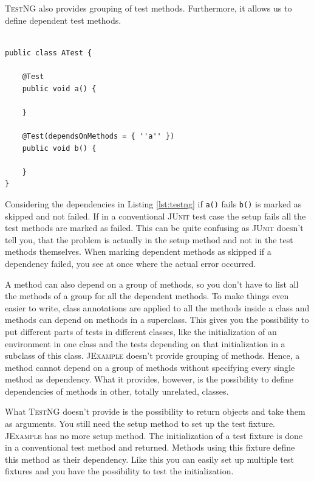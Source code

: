 \documentclass[11pt]{article}
\newcommand{\JUnit}{\textsc{JUnit}\xspace}
\newcommand{\JExample}{\textsc{JExample}\xspace}
\newcommand{\TestNG}{\textsc{TestNG}\xspace}
\newcommand{\ttt}[1]{\texttt{#1}}
\begin{document}
\TestNG also provides grouping of test methods. Furthermore, it allows us to define dependent test methods.

\begin{lstlisting}[label=lst:testng,caption=Dependent test methods with \TestNG.]

public class ATest {

	@Test
	public void a() {
		
	}
	
	@Test(dependsOnMethods = { ''a'' })
	public void b() {
	
	}
}

\end{lstlisting}

Considering the dependencies in Listing \ref{lst:testng} if \ttt{a()} fails \ttt{b()} is marked as skipped and not failed. If in a conventional \JUnit test case the setup fails all the test methods are marked as failed. This can be quite confusing as \JUnit doesn't tell you, that the problem is actually in the setup method and not in the test methods themselves. When marking dependent methods as skipped if a dependency failed, you see at once where the actual error occurred.

A method can also depend on a group of methods, so you don't have to list all the methods of a group for all the dependent methods. To make things even easier to write, class annotations are applied to all the methods inside a class and methods can depend on methods in a superclass. This gives you the possibility to put different parts of tests in different classes, like the initialization of an environment in one class and the tests depending on that initialization in a subclass of this class. \JExample doesn't provide grouping of methods. Hence, a method cannot depend on a group of methods without specifying every single method as dependency. What it provides, however, is the possibility to define dependencies of methods in other, totally unrelated, classes.

What \TestNG doesn't provide is the possibility to return objects and take them as arguments. You still need the setup method to set up the test fixture. \JExample has no more setup method. The initialization of a test fixture is done in a conventional test method and returned. Methods using this fixture define this method as their dependency. Like this you can easily set up multiple test fixtures and you have the possibility to test the initialization.
\end{document}
